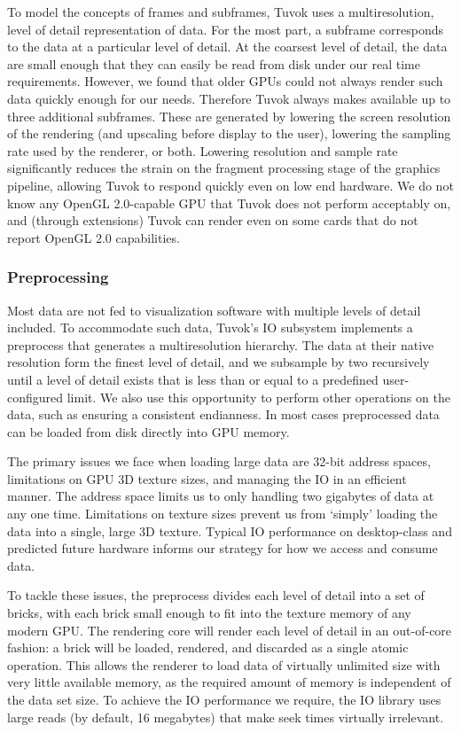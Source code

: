 To model the concepts of frames and subframes, Tuvok uses a
multiresolution, level of detail representation of data.  For the
most part, a subframe corresponds to the data at a particular level
of detail. At the coarsest level of detail, the data are small
enough that they can easily be read from disk under our real time
requirements. However, we found that older GPUs could not always render
such data quickly enough for our needs. Therefore Tuvok always makes
available up to three additional subframes. These are generated by
lowering the screen resolution of the rendering (and upscaling before
display to the user), lowering the sampling rate used by the renderer,
or both. Lowering resolution and sample rate significantly reduces
the strain on the fragment processing stage of the graphics pipeline,
allowing Tuvok to respond quickly even on low end hardware. We do not
know any OpenGL 2.0-capable GPU that Tuvok does not perform acceptably
on, and (through extensions) Tuvok can render even on some cards that
do not report OpenGL 2.0 capabilities.

\subsubsection{Preprocessing}

Most data are not fed to visualization software with multiple
levels of detail included. To accommodate such data, Tuvok's IO
subsystem implements a preprocess that generates a multiresolution
hierarchy. The data at their native resolution form the finest level
of detail, and we subsample by two recursively until a level of detail
exists that is less than or equal to a predefined user-configured
limit. We also use this opportunity to perform other operations on
the data, such as ensuring a consistent endianness.  In most cases
preprocessed data can be loaded from disk directly into GPU memory.

The primary issues we face when loading large data are
32-bit address spaces, limitations on GPU 3D texture sizes,
and managing the IO in an efficient manner. The address
space limits us to only handling two gigabytes of data at any
one time. Limitations on texture sizes prevent us from `simply'
loading the data into a single, large 3D texture. Typical
IO performance on desktop-class and predicted future hardware
informs our strategy for how we access and consume
data.

To tackle these issues, the preprocess divides each level of
detail into a set of bricks, with each brick small enough to fit
into the texture memory of any modern GPU. The rendering
core will render each level of detail in an out-of-core fashion:
a brick will be loaded, rendered, and discarded as a single
atomic operation. This allows the renderer to load data of
virtually unlimited size with very little available memory, as
the required amount of memory is independent of the data
set size. To achieve the IO performance we require, the IO
library uses large reads (by default, 16 megabytes) that make
seek times virtually irrelevant.

